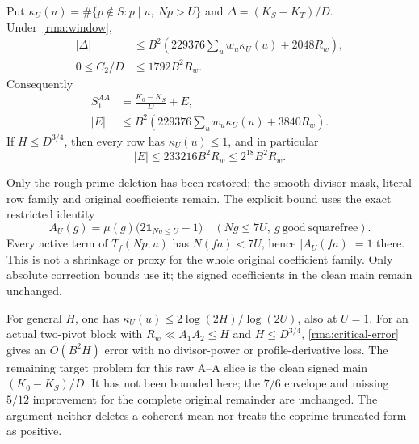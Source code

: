 \begin{theorem}\label{rma:mask}
Put $\kappa_U(u)=\#\{p\notin S:p\mid u,\ Np>U\}$ and
$\Delta=(K_S-K_T)/D$. Under~\eqref{rma:window},
\begin{align}
 |\Delta|&\le B^2\left(229376\sum_u w_u\kappa_U(u)+2048R_w\right),
                    \label{rma:delta}\\
 0\le C_2/D&\le1792B^2R_w.\label{rma:Cbound}
\end{align}
Consequently
\begin{align}
 S_1^{AA}&=\frac{K_0-K_S}{D}+E,\label{rma:clean}\\
 |E|&\le B^2\left(229376\sum_u w_u\kappa_U(u)+3840R_w\right).
                    \label{rma:error}
\end{align}
If $H\le D^{3/4}$, then every row has $\kappa_U(u)\le1$, and in particular
\begin{equation}\label{rma:critical-error}
 |E|\le233216B^2R_w\le2^{18}B^2R_w.
\end{equation}
\end{theorem}
Only the rough-prime deletion has been restored; the smooth-divisor
mask, literal row family and original coefficients remain. The explicit
bound uses the exact restricted identity
\[
 A_U(g)=\mu(g)\bigl(2\mathbf1_{Ng\le U}-1\bigr)
 \quad(Ng\le7U,\ g\ \mathrm{good\ squarefree}).
\]
Every active term of $T_f(Np;u)$ has $N(fa)<7U$, hence
$|A_U(fa)|=1$ there. This is not a shrinkage or proxy for the whole
original coefficient family. Only absolute correction bounds use it;
the signed coefficients in the clean main remain unchanged.

For general $H$, one has
$\kappa_U(u)\le2\log(2H)/\log(2U)$, also at $U=1$.
For an actual two-pivot block with $R_w\ll A_1A_2\le H$ and
$H\le D^{3/4}$, \eqref{rma:critical-error} gives an $O(B^2H)$
error with no divisor-power or profile-derivative loss. The remaining
target problem for this raw A--A slice is the clean signed main
$(K_0-K_S)/D$. It has not been bounded here; the $7/6$ envelope and
missing $5/12$ improvement for the complete original remainder are
unchanged. The argument neither deletes a coherent mean nor treats the
coprime-truncated form as positive.


